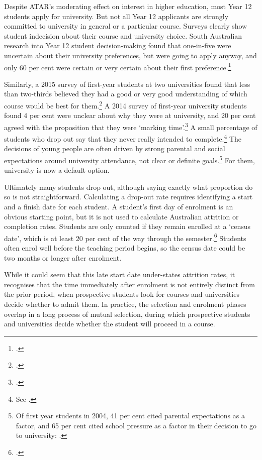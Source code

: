 Despite ATAR's moderating effect on interest in higher education, most Year 12 students apply for university. But not all Year 12 applicants are strongly committed to university in general or a particular course. Surveys clearly show student indecision about their course and university choice. South Australian research into Year 12 student decision-making found that one-in-five were uncertain about their university preferences, but were going to apply anyway, and only 60 per cent were certain or very certain about their first preference.\footcite[][8]{Parks2017}

Similarly, a 2015 survey of first-year students at two universities found that less than two-thirds believed they had a good or very good understanding of which course would be best for them.\footcite[][58]{Harvey2016} 
A 2014 survey of first-year university students found 4 per cent were unclear about why they were at university, and 20 per cent agreed with the proposition that they were `marking time'.\footcite[][31]{Baik2015} 
A small percentage of students who drop out say that they never really intended to complete.\footnote{See .}
The decisions of young people are often driven by strong parental and social expectations around university attendance, not clear or definite goals.\footnote{Of first year students in 2004, 41 per cent cited parental expectations as a factor, and 65 per cent cited school pressure as a factor in their decision to go to university: \textcite[][22]{Baik2015}.} For them, university is now a default option.

Ultimately many students drop out, although saying exactly what proportion do so is not straightforward. Calculating a drop-out rate requires identifying a start and a finish date for each student. A student's first day of enrolment is an obvious starting point, but it is not used to calculate Australian attrition or completion rates. Students are only counted if they remain enrolled at a `census date', which is at least 20 per cent of the way through the semester.\footcite[][section~6.30]{DIICCSRTE2013} 
Students often enrol well before the teaching period begins, so the census date could be two months or longer after enrolment.

While it could seem that this late start date under-states attrition rates, it recognises that the time immediately after enrolment is not entirely distinct from the prior period, when prospective students look for courses and universities decide whether to admit them. In practice, the selection and enrolment phases overlap in a long process of mutual selection, during which prospective students and universities decide whether the student will proceed in a course.


